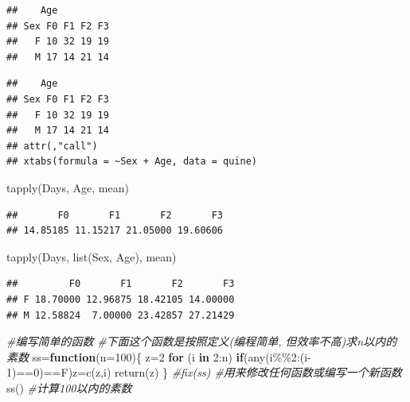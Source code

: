 \documentclass[
]{book}
\newenvironment{Shaded}{\begin{snugshade}}{\end{snugshade}}
\newcommand{\AttributeTok}[1]{\textcolor[rgb]{0.77,0.63,0.00}{#1}}
\newcommand{\CommentTok}[1]{\textcolor[rgb]{0.56,0.35,0.01}{\textit{#1}}}
\newcommand{\ControlFlowTok}[1]{\textcolor[rgb]{0.13,0.29,0.53}{\textbf{#1}}}
\newcommand{\DecValTok}[1]{\textcolor[rgb]{0.00,0.00,0.81}{#1}}
\newcommand{\FunctionTok}[1]{\textcolor[rgb]{0.00,0.00,0.00}{#1}}
\newcommand{\NormalTok}[1]{#1}
\newcommand{\OtherTok}[1]{\textcolor[rgb]{0.56,0.35,0.01}{#1}}
\newcommand{\SpecialCharTok}[1]{\textcolor[rgb]{0.00,0.00,0.00}{#1}}
\begin{document}
\begin{verbatim}
##    Age
## Sex F0 F1 F2 F3
##   F 10 32 19 19
##   M 17 14 21 14
\end{verbatim}

\begin{verbatim}
##    Age
## Sex F0 F1 F2 F3
##   F 10 32 19 19
##   M 17 14 21 14
## attr(,"call")
## xtabs(formula = ~Sex + Age, data = quine)
\end{verbatim}

\begin{Shaded}
\begin{Highlighting}[]
\FunctionTok{tapply}\NormalTok{(Days, Age, mean)}
\end{Highlighting}
\end{Shaded}

\begin{verbatim}
##       F0       F1       F2       F3 
## 14.85185 11.15217 21.05000 19.60606
\end{verbatim}

\begin{Shaded}
\begin{Highlighting}[]
\FunctionTok{tapply}\NormalTok{(Days, }\FunctionTok{list}\NormalTok{(Sex, Age), mean)}
\end{Highlighting}
\end{Shaded}

\begin{verbatim}
##         F0       F1       F2       F3
## F 18.70000 12.96875 18.42105 14.00000
## M 12.58824  7.00000 23.42857 27.21429
\end{verbatim}

\begin{Shaded}
\begin{Highlighting}[]
\CommentTok{\#编写简单的函数}
\CommentTok{\#下面这个函数是按照定义(编程简单, 但效率不高)求n以内的素数}
\NormalTok{ss}\OtherTok{=}\ControlFlowTok{function}\NormalTok{(}\AttributeTok{n=}\DecValTok{100}\NormalTok{)\{}
\NormalTok{  z}\OtherTok{=}\DecValTok{2}
  \ControlFlowTok{for}\NormalTok{ (i }\ControlFlowTok{in} \DecValTok{2}\SpecialCharTok{:}\NormalTok{n)}
    \ControlFlowTok{if}\NormalTok{(}\FunctionTok{any}\NormalTok{(i}\SpecialCharTok{\%\%}\DecValTok{2}\SpecialCharTok{:}\NormalTok{(i}\DecValTok{{-}1}\NormalTok{)}\SpecialCharTok{==}\DecValTok{0}\NormalTok{)}\SpecialCharTok{==}\NormalTok{F)z}\OtherTok{=}\FunctionTok{c}\NormalTok{(z,i)}
  \FunctionTok{return}\NormalTok{(z) }
\NormalTok{\}}
\CommentTok{\#fix(ss) \#用来修改任何函数或编写一个新函数}
\FunctionTok{ss}\NormalTok{() }\CommentTok{\#计算100以内的素数}
\end{Highlighting}
\end{Shaded}
\end{document}
